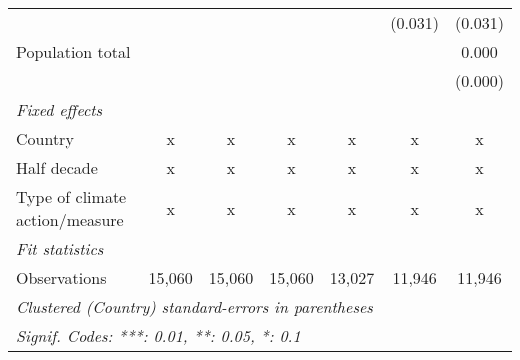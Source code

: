 \begin{tabular}{lcccccc}
                                             &         &         &                &              & (0.031) & (0.031)\\   
   Population total                          &         &         &                &              &         & 0.000\\   
                                             &         &         &                &              &         & (0.000)\\   
   \emph{Fixed effects}\\
   Country                                   & x       & x       & x              & x            & x       & x\\  
   Half decade                               & x       & x       & x              & x            & x       & x\\  
   Type of climate action/measure            & x       & x       & x              & x            & x       & x\\  
   \midrule \emph{Fit statistics}\\
   Observations                              & 15,060  & 15,060  & 15,060         & 13,027       & 11,946  & 11,946\\  
   \midrule
   \multicolumn{7}{l}{\emph{Clustered (Country) standard-errors in parentheses}}\\
   \multicolumn{7}{l}{\emph{Signif. Codes: ***: 0.01, **: 0.05, *: 0.1}}\\
\end{tabular}
\par\endgroup


